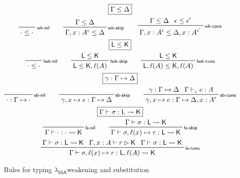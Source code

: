 \documentclass[acmsmall,screen,review]{acmart}
\newcommand{\ms}[1]{\ensuremath{\mathsf{#1}}}
\newcommand{\thyp}[3]{#1 : {#2}^{#3}}
\newcommand{\bhyp}[2]{#1 : #2}
\newcommand{\lhyp}[2]{#1(#2)}
\newcommand{\rle}[1]{{\scriptsize\textsf{#1}}}
\newcommand{\hasty}[4]{#1 \vdash_{#2} #3: {#4}}
\newcommand{\haslb}[3]{#1 \vdash #2 \rhd #3}
\newcommand{\issubst}[3]{#1: #2 \mapsto #3}
\newcommand{\lbsubst}[4]{#1 \vdash #2: #3 \rightsquigarrow #4}
\newcommand{\isotopessa}{\(\lambda_{\ms{SSA}}\)}
\begin{document}
\begin{figure}
  \begin{gather*}
    \boxed{\Gamma \leq \Delta} \\
    \prftree[r]{\rle{wk-nil}}{}{\cdot \leq \cdot} \qquad
    \prftree[r]{\rle{wk-skip}}{\Gamma \leq \Delta}{\Gamma, \thyp{x}{A}{\epsilon} \leq \Delta} \qquad
    \prftree[r]{\rle{wk-cons}}{\Gamma \leq \Delta}{\epsilon \leq \epsilon'}
      {\Gamma, \thyp{x}{A}{\epsilon} \leq \Delta, \thyp{x}{A}{\epsilon'}} \\
    \boxed{\ms{L} \leq \ms{K}} \\
    \prftree[r]{\rle{lwk-nil}}{}{\cdot \leq \cdot} \qquad
    \prftree[r]{\rle{lwk-skip}}{\ms{L} \leq \ms{K}}{\ms{L} \leq \ms{K}, \lhyp{\ell}{A}} \qquad
    \prftree[r]{\rle{lwk-cons}}{\ms{L} \leq \ms{K}}
      {\ms{L}, \lhyp{\ell}{A} \leq \ms{K}, \lhyp{\ell}{A}} \\
    \boxed{\issubst{\gamma}{\Gamma}{\Delta}} \\
    \prftree[r]{\rle{sb-nil}}{}{\issubst{\cdot}{\Gamma}{\cdot}} \qquad
    \prftree[r]{\rle{sb-skip}}{}{\issubst{\gamma}{\Gamma}{\Delta}}
      {\issubst{\gamma, x \mapsto e}{\Gamma}{\Delta}} \qquad
    \prftree[r]{\rle{sb-cons}}{\issubst{\gamma}{\Gamma}{\Delta}}{\hasty{\Gamma}{\epsilon}{e}{A}}
      {\issubst{\gamma, x \mapsto e}{\Gamma}{\Delta, \thyp{x}{A}{\epsilon}}} \\
    \boxed{\lbsubst{\Gamma}{\sigma}{\ms{L}}{\ms{K}}} \\
    \prftree[r]{\rle{ls-nil}}{}{\lbsubst{\Gamma}{\cdot}{\cdot}{\ms{K}}} 
    \qquad
    \prftree[r]{\rle{ls-skip}}
      {\lbsubst{\Gamma}{\sigma}{\ms{L}}{\ms{K}}}
      {\lbsubst{\Gamma}{\sigma, \ell(x) \mapsto r}{\ms{L}}{\ms{K}}} \\
    \prftree[r]{\rle{ls-cons}}
      {\lbsubst{\Gamma}{\sigma}{\ms{L}}{\ms{K}}}{\haslb{\Gamma, \bhyp{x}{A}}{r}{\ms{K}}}
      {\lbsubst{\Gamma}{\sigma}{\ms{L}}{\ms{K}}}
      {\lbsubst{\Gamma}{\sigma, \ell(x) \mapsto r}{\ms{L}, \lhyp{\ell}{A}}{\ms{K}}}
  \end{gather*}
  \caption{Rules for typing \isotopessa weakening and substitution}
  \Description{}
  \label{fig:ssa-meta-rules}
\end{figure}
\end{document}
